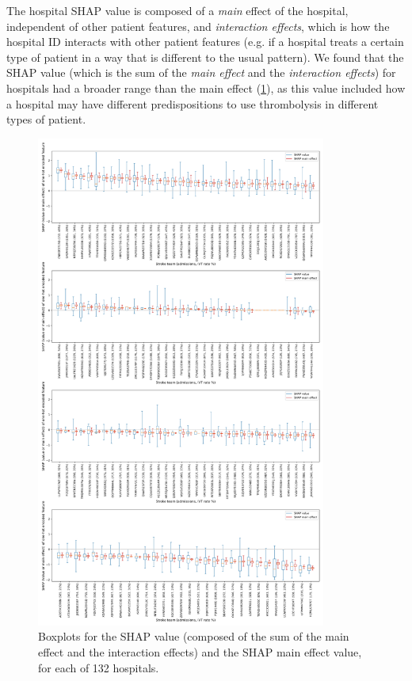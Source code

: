 The hospital SHAP value is composed of a \emph{main} effect of the hospital, independent of other patient features, and \emph{interaction effects}, which is how the hospital ID interacts with other patient features (e.g. if a hospital treats a certain type of patient in a way that is different to the usual pattern). We found that the SHAP value (which is the sum of the \emph{main effect} and the \emph{interaction effects}) for hospitals had a broader range than the main effect (\ref{fig:shap_boxplot_1}), as this value included how a hospital may have different predispositions to use thrombolysis in different types of patient. 

\begin{figure}
\centering
\includegraphics[width=0.85\textwidth]{./images/03c_xgb_10_features_individual_hosp_shap_value_and_main_effect_attend_vs_notattend_boxplot}
\caption{Boxplots for the SHAP value (composed of the sum of the main effect and the interaction effects) and the SHAP main effect value, for each of 132 hospitals.}
\label{fig:shap_boxplot_1}
\end{figure}

